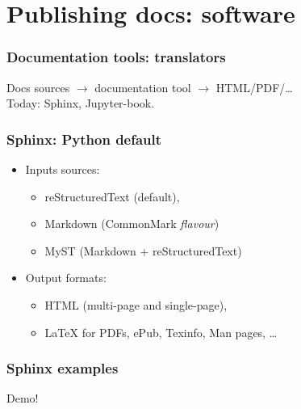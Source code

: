 \section{Publishing docs: software}
\begin{frame}[c]
  \frametitle{Documentation tools: translators}
  Docs sources \(\rightarrow\) documentation tool \(\rightarrow\) HTML/PDF/\ldots{}\\
  Today: \alert{Sphinx}, \alert{Jupyter-book}.
\end{frame}
\begin{frame}[c]
  \frametitle{Sphinx: Python default}
  \begin{itemize}
    \item Inputs sources:
      \begin{itemize}
        \item reStructuredText (default),
        \item Markdown (CommonMark \emph{flavour}\footnotemark[3]{})
        \item MyST (Markdown + reStructuredText)\footnotemark[4]{}
      \end{itemize}
    \item Output formats:
      \begin{itemize}
        \item HTML (multi-page and single-page),
        \item \LaTeX{} for PDFs, ePub, Texinfo, Man pages, \ldots{}
      \end{itemize}
  \end{itemize}
\end{frame}
\begin{frame}[c]
  \frametitle{Sphinx examples}
  Demo!
\end{frame}

